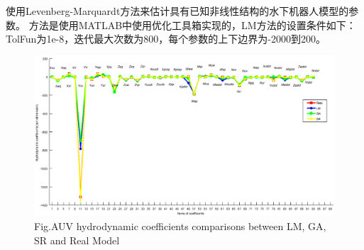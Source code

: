 使用Levenberg-Marquardt方法来估计具有已知非线性结构的水下机器人模型的参数。 方法是使用MATLAB中使用优化工具箱实现的，LM方法的设置条件如下：TolFun为1e-8，迭代最大次数为800，每个参数的上下边界为-2000到200。

\begin{figure}[!htp]
\centering
\includegraphics[width=1\textwidth]{figure/chap3/four_full.eps}
\label{fig:chap3:F4}
 {Fig.}{AUV hydrodynamic coefficients comparisons between LM, GA, SR and Real Model}
\end{figure}

